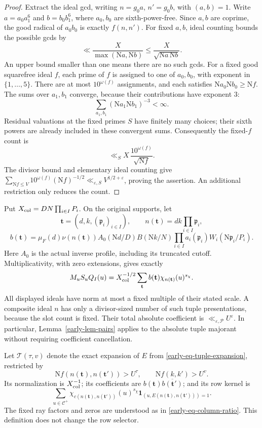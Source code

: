 \documentclass[11pt]{article}
\theoremstyle{definition}
\newcommand{\N}{\mathrm N}
\newcommand{\eps}{\varepsilon}
\newcommand{\Cplus}{\mathcal C^+}
\newcommand{\lls}{\ll_{\eps,\mathcal P}}
\begin{document}
\begin{proof}
Extract the ideal gcd, writing \(n=g_0a\), \(n'=g_0b\), with
\((a,b)=1\).  Write \(a=a_0a_1^6\) and \(b=b_0b_1^6\), where
\(a_0,b_0\) are sixth-power-free.  Since \(a,b\) are coprime, the good
radical of \(a_0b_0\) is exactly \(f(n,n')\).  For fixed \(a,b\), ideal
counting bounds the possible gcds by
\[
 \ll \frac{X}{\max(\N a,\N b)}
       \le \frac{X}{\sqrt{\N a\,\N b}}.
\]
An upper bound smaller than one means there are no such gcds.
For a fixed good squarefree ideal \(f\), each prime of \(f\) is assigned
to one of \(a_0,b_0\), with exponent in \(\{1,\ldots,5\}\).
There are at most \(10^{\omega(f)}\) assignments, and each satisfies
\(\N a_0\N b_0\ge\N f\).  The sums over \(a_1,b_1\) converge,
because their contributions have exponent \(3\):
\[
 \sum_{a_1,b_1}(\N a_1\N b_1)^{-3}<\infty.
\]
Residual valuations at the fixed primes \(S\) have finitely many
choices; their sixth powers are already included in these convergent
sums.  Consequently the fixed-\(f\) count is
\[
 \ll_S X\,\frac{10^{\omega(f)}}{\sqrt{\N f}}.
\]
The divisor bound and elementary ideal counting give
\(\sum_{\N f\le V}10^{\omega(f)}(\N f)^{-1/2}
\ll_{\eps,S}V^{1/2+\eps}\), proving the assertion.
An additional restriction only reduces the count.
\end{proof}

Put \(X_{\rm col}=DN\prod_{i\in I}P_i\).  On the original supports,
let
\[
 \mathbf t=(d,k,(\mathfrak p_i)_{i\in I}),\qquad
 n(\mathbf t)=dk\prod_{i\in I}\mathfrak p_i,
\]
\[
 b(\mathbf t)=\mu_F(d)\nu(n(\mathbf t))
 A_0(\N d/D)B(\N k/N)
 \prod_{i\in I}a_i(\mathfrak p_i)W_i(\N\mathfrak p_i/P_i).
\]
Here \(A_0\) is the actual inverse profile, including its truncated
cutoff.  Multiplicativity, with zero extensions, gives exactly
\begin{equation}\label{early-eq-tuple-expansion}
 M_uS_uQ_I(u)=X_{\rm col}^{-1/2}
          \sum_{\mathbf t}b(\mathbf t)
                     \chi_{n(\mathbf t)}(u)^{s_\chi}.
\end{equation}
All displayed ideals have norm at most a fixed multiple of their stated
scale.  A composite ideal \(n\) has only a divisor-sized number of such
tuple presentations, because the slot count is fixed.  Their total
absolute coefficient is \(\lls U^\eps\).  In particular,
Lemma~\ref{early-lem-pairs} applies to the absolute tuple majorant
without requiring coefficient cancellation.

Let \(\mathcal T(\tau,v)\) denote the exact expansion of
\(E\) from \eqref{early-eq-tuple-expansion}, restricted by
\[
 \N f(n(\mathbf t),n(\mathbf t'))>U^\tau,\qquad
 \N f(k,k')>U^v.
\]
Its normalization is \(X_{\rm col}^{-1}\); its coefficients are
\(b(\mathbf t)\overline{b(\mathbf t')}\); and its row kernel is
\[
 \sum_{u\in\Cplus}
     \chi_{c(n(\mathbf t),n(\mathbf t'))}(u)^{s_\chi}
         \mathbf1_{(u,E(n(\mathbf t),n(\mathbf t')))=1}.
\]
The fixed ray factors and zeros are understood as in
\eqref{early-eq-column-ratio}.  This definition does not change the
row selector.
\end{document}
